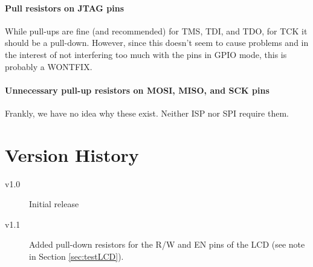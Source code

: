 \documentclass{article}
\begin{document}
\paragraph{Pull resistors on JTAG pins}
While pull-ups are fine (and recommended) for TMS, TDI, and TDO, for TCK it should be a pull-down. However, since this doesn't seem to cause problems and in the interest of not interfering too much with the pins in GPIO mode, this is probably a WONTFIX. 
\paragraph{Unnecessary pull-up resistors on MOSI, MISO, and SCK pins}
Frankly, we have no idea why these exist. Neither ISP nor SPI require them. 

\section{Version History}
\begin{description}
\item[v1.0] Initial release
\item[v1.1] Added pull-down resistors for the R/W and EN pins of the LCD (see note in Section \ref{sec:testLCD}). 
\end{description}
\end{document}
